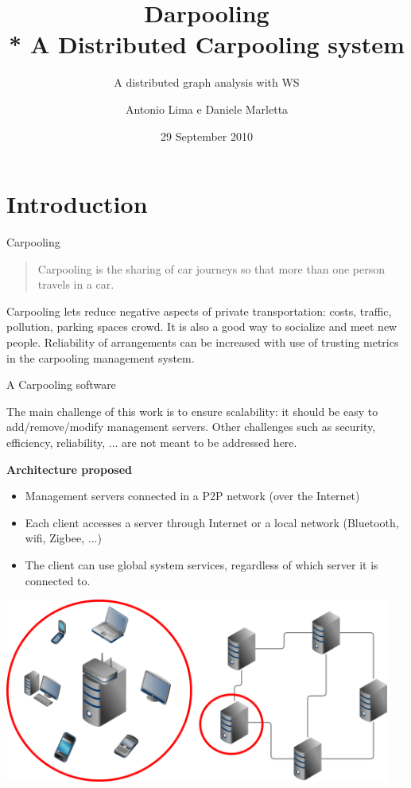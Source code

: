 \documentclass[mathserif]{beamer}
\title[Darpooling]
{Darpooling\\* A Distributed Carpooling system}
\subtitle{A distributed graph analysis with WS}
\author[A. Lima - D. Marletta]{Antonio Lima e Daniele Marletta}
\institute[UniCT]{
    Universit\`a degli Studi di Catania\\
        CdL in Ingegneria Informatica - Laurea Specialistica \\
        Corso di Sistemi Distribuiti
}
\date[29/09/2010]{29 September 2010}
\begin{document}
\begin{frame}[plain]
  \titlepage
\end{frame}
%

\section{Introduction}

\begin{frame}{Carpooling}  
\begin{quote}
Carpooling is the sharing of car journeys so that more than one person travels in a car.

\end{quote}

\vfill

Carpooling lets reduce negative aspects of private transportation: costs,
traffic, pollution, parking spaces crowd. It is also a good way to socialize and meet new people.
Reliability of arrangements can be increased with use of trusting metrics
in the carpooling management system.
\end{frame}

\begin{frame}{A Carpooling software}

The main challenge of this work is to ensure scalability: 
it should be easy to add/remove/modify management servers. Other challenges
such as security, efficiency, reliability, ... are not meant to be
addressed here.
\vfill

\textbf{Architecture proposed}
\begin{itemize}
\item
Management servers connected in a P2P network (over the Internet)
\item
Each client accesses a server through Internet or a local network 
(Bluetooth, wifi, Zigbee, ...)
\item
The client can use global system services, regardless of which server it is
connected to.
\end{itemize}
\end{frame}

\begin{frame}[plain]
\begin{center}
\includegraphics[width=0.95\textwidth]{img/darpooling.png}
\end{center}
\end{frame}
\end{document}
